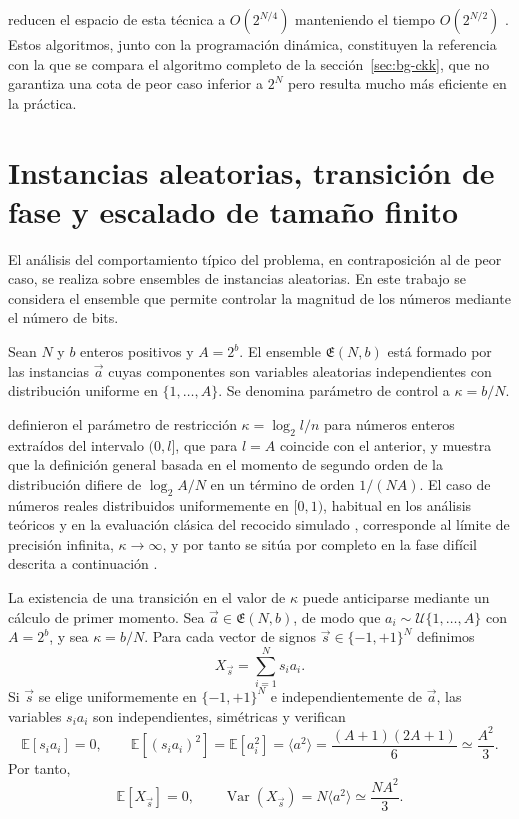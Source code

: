 \textcite{schroeppel1981} reducen el espacio de esta técnica a $O(2^{N/4})$ manteniendo el tiempo $O(2^{N/2})$ \parencite{korf1998}. Estos algoritmos, junto con la programación dinámica, constituyen la referencia con la que se compara el algoritmo completo de la sección~\ref{sec:bg-ckk}, que no garantiza una cota de peor caso inferior a $2^N$ pero resulta mucho más eficiente en la práctica.

\section{Instancias aleatorias, transición de fase y escalado de tamaño finito}\label{sec:bg-random}

El análisis del comportamiento típico del problema, en contraposición al de peor caso, se realiza sobre ensembles de instancias aleatorias. En este trabajo se considera el ensemble que permite controlar la magnitud de los números mediante el número de bits.

\begin{definition}\label{def:ensemble}
Sean $N$ y $b$ enteros positivos y $A = 2^b$. El ensemble $\mathfrak{E}(N,b)$ está formado por las instancias $\vec{a}$ cuyas componentes son variables aleatorias independientes con distribución uniforme en $\{1, \ldots, A\}$. Se denomina parámetro de control a $\kappa = b/N$.
\end{definition}

\textcite{gent1996} definieron el parámetro de restricción $\kappa = \log_2 l / n$ para números enteros extraídos del intervalo $(0, l]$, que para $l = A$ coincide con el anterior, y \textcite{mertens1998} muestra que la definición general basada en el momento de segundo orden de la distribución difiere de $\log_2 A / N$ en un término de orden $1/(NA)$. El caso de números reales distribuidos uniformemente en $[0,1)$, habitual en los análisis teóricos y en la evaluación clásica del recocido simulado \parencite{johnson1991,ferreira1998}, corresponde al límite de precisión infinita, $\kappa \to \infty$, y por tanto se sitúa por completo en la fase difícil descrita a continuación \parencite{mertens2001}.

La existencia de una transición en el valor de $\kappa$ puede anticiparse mediante un cálculo de primer momento. Sea $\vec{a}\in\mathfrak{E}(N,b)$, de modo que $a_i\sim\mathcal{U}\{1,\ldots,A\}$ con $A=2^b$, y sea $\kappa=b/N$. Para cada vector de signos $\vec{s}\in\{-1,+1\}^N$ definimos
\[
X_{\vec{s}}=\sum_{i=1}^{N}s_i a_i.
\]
Si $\vec{s}$ se elige uniformemente en $\{-1,+1\}^N$ e independientemente de $\vec{a}$, las variables $s_i a_i$ son independientes, simétricas y verifican
\[
\mathbb{E}[s_i a_i]=0,
\qquad
\mathbb{E}[(s_i a_i)^2]=\mathbb{E}[a_i^2]=\langle a^2\rangle
=\frac{(A+1)(2A+1)}{6}
\simeq\frac{A^2}{3}.
\]
Por tanto,
\[
\mathbb{E}[X_{\vec{s}}]=0,
\qquad
\operatorname{Var}(X_{\vec{s}})
=N\langle a^2\rangle
\simeq\frac{NA^2}{3}.
\]

